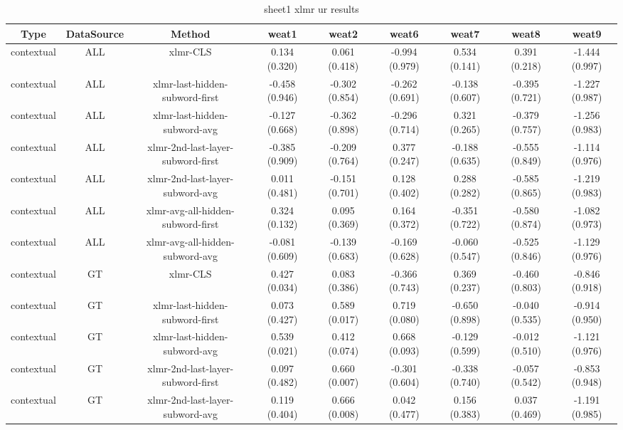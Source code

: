 \begin{sidewaystable}[htb]
    \centering
    \caption{sheet1 xlmr ur results}
    \label{appendix_tab:sheet1_xlmr_ur_results}
    \small
    \begin{tabular}{@{}ccccccccc@{}}
        \toprule
        Type & DataSource & Method & weat1 & weat2 & weat6 & weat7 & weat8 & weat9 \\
        \midrule
        contextual & ALL & xlmr-CLS & 0.134 (0.320) & 0.061 (0.418) & -0.994 (0.979) & 0.534 (0.141) & 0.391 (0.218) & -1.444 (0.997) \\
        contextual & ALL & xlmr-last-hidden-subword-first & -0.458 (0.946) & -0.302 (0.854) & -0.262 (0.691) & -0.138 (0.607) & -0.395 (0.721) & -1.227 (0.987) \\
        contextual & ALL & xlmr-last-hidden-subword-avg & -0.127 (0.668) & -0.362 (0.898) & -0.296 (0.714) & 0.321 (0.265) & -0.379 (0.757) & -1.256 (0.983) \\
        contextual & ALL & xlmr-2nd-last-layer-subword-first & -0.385 (0.909) & -0.209 (0.764) & 0.377 (0.247) & -0.188 (0.635) & -0.555 (0.849) & -1.114 (0.976) \\
        contextual & ALL & xlmr-2nd-last-layer-subword-avg & 0.011 (0.481) & -0.151 (0.701) & 0.128 (0.402) & 0.288 (0.282) & -0.585 (0.865) & -1.219 (0.983) \\
        contextual & ALL & xlmr-avg-all-hidden-subword-first & 0.324 (0.132) & 0.095 (0.369) & 0.164 (0.372) & -0.351 (0.722) & -0.580 (0.874) & -1.082 (0.973) \\
        contextual & ALL & xlmr-avg-all-hidden-subword-avg & -0.081 (0.609) & -0.139 (0.683) & -0.169 (0.628) & -0.060 (0.547) & -0.525 (0.846) & -1.129 (0.976) \\
        contextual & GT & xlmr-CLS & 0.427 (0.034) & 0.083 (0.386) & -0.366 (0.743) & 0.369 (0.237) & -0.460 (0.803) & -0.846 (0.918) \\
        contextual & GT & xlmr-last-hidden-subword-first & 0.073 (0.427) & 0.589 (0.017) & 0.719 (0.080) & -0.650 (0.898) & -0.040 (0.535) & -0.914 (0.950) \\
        contextual & GT & xlmr-last-hidden-subword-avg & 0.539 (0.021) & 0.412 (0.074) & 0.668 (0.093) & -0.129 (0.599) & -0.012 (0.510) & -1.121 (0.976) \\
        contextual & GT & xlmr-2nd-last-layer-subword-first & 0.097 (0.482) & 0.660 (0.007) & -0.301 (0.604) & -0.338 (0.740) & -0.057 (0.542) & -0.853 (0.948) \\
        contextual & GT & xlmr-2nd-last-layer-subword-avg & 0.119 (0.404) & 0.666 (0.008) & 0.042 (0.477) & 0.156 (0.383) & 0.037 (0.469) & -1.191 (0.985) \\

\end{tabular}
\end{sidewaystable}
